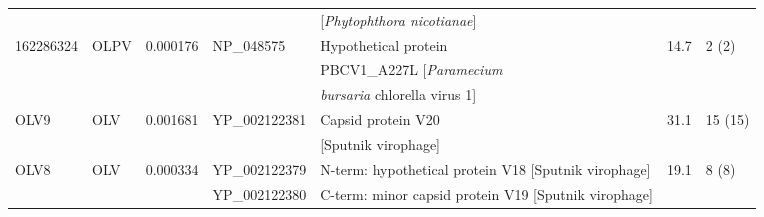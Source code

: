 \begin{table}
\begin{tabularx}{\textwidth}{p{1.3cm}p{1.2cm}p{1cm}p{2cm}p{4.7cm}p{0.6cm}p{1cm}}
 &  &  &  & [\emph{Phytophthora nicotianae}] &  &  \\
162286324 & OLPV & 0.000176 & NP\_048575 & Hypothetical protein & 14.7 & 2 (2) \\
 &  &  &  & PBCV1\_A227L [\emph{Paramecium} &  &  \\
 &  &  &  & \emph{bursaria} chlorella virus 1] &  &  \\
OLV9 & OLV & 0.001681 & YP\_002122381 & Capsid protein V20 & 31.1 & 15 (15) \\
 &  &  &  & [Sputnik virophage] &  &  \\
OLV8 & OLV & 0.000334 & YP\_002122379 & N-term: hypothetical protein V18 [Sputnik virophage]   & 19.1 & 8 (8) \\
 &  &  & YP\_002122380 &  C-term: minor capsid protein V19 [Sputnik virophage]  &  &  \\
\bottomrule
\end{tabularx}
\end{table}
\endgroup

